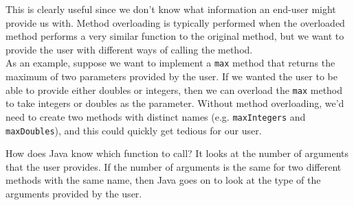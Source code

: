 This is clearly useful since we don't know what information an end-user might provide us with. Method overloading is typically performed when the overloaded method performs a very similar function to the original method, but we want to provide the user with different ways of calling the method. \\

As an example, suppose we want to implement a \verb!max! method that returns the maximum of two parameters provided by the user. If we wanted the user to be able to provide either doubles or integers, then we can overload the \verb!max! method to take integers or doubles as the parameter. Without method overloading, we'd need to create two methods with distinct names (e.g. \verb!maxIntegers! and \verb!maxDoubles!), and this could quickly get tedious for our user.

How does Java know which function to call? It looks at the number of arguments that the user provides. If the number of arguments is the same for two different methods with the same name, then Java goes on to look at the type of the arguments provided by the user. 